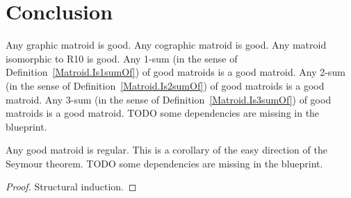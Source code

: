 \chapter{Conclusion}

\begin{definition}
    \label{Matroid.IsGood}
    \leanok
    Any graphic matroid is good.
    Any cographic matroid is good.
    Any matroid isomorphic to R10 is good.
    Any 1-sum (in the sense of Definition~\ref{Matroid.Is1sumOf}) of good matroids is a good matroid.
    Any 2-sum (in the sense of Definition~\ref{Matroid.Is2sumOf}) of good matroids is a good matroid.
    Any 3-sum (in the sense of Definition~\ref{Matroid.Is3sumOf}) of good matroids is a good matroid.
    TODO some dependencies are missing in the blueprint.
\end{definition}

\begin{corollary}
    \label{Matroid.IsGood.isRegular}
    \leanok
    Any good matroid is regular. This is a corollary of the easy direction of the Seymour theorem.
    TODO some dependencies are missing in the blueprint.
\end{corollary}

\begin{proof}
    Structural induction.
\end{proof}
